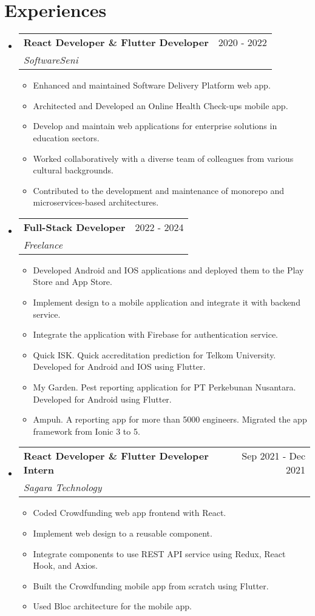 \documentclass[a4paper,11pt]{article}
\makeatletter
\newcommand{\resumeSubheading}[4]{
  \vspace{-2pt}
\item
  \begin{tabular*}{0.97\textwidth}[t]{l@{\extracolsep{\fill}}r}
    \textbf{#1} & #2 \\
    \textit{\small#3} & \textit{\small #4} \\
  \end{tabular*}\vspace{-8pt}
}
\makeatother
\begin{document}
\section{Experiences}
\begin{itemize}[leftmargin=0.15in, label={}]
    \resumeSubheading{React Developer \& Flutter Developer}{2020 - 2022}{SoftwareSeni}{}
    \begin{itemize}
      \item Enhanced and maintained Software Delivery Platform web app.
      \item Architected and Developed an Online Health Check-ups mobile app.
      \item Develop and maintain web applications for enterprise solutions in education sectors.
      \item Worked collaboratively with a diverse team of colleagues from various cultural backgrounds.
      \item Contributed to the development and maintenance of monorepo and microservices-based architectures.
    \end{itemize}\vspace{-4pt}

    \resumeSubheading{Full-Stack Developer}{2022 - 2024}{Freelance}{}
    \begin{itemize}
      \item Developed Android and IOS applications and deployed them to the Play Store and App Store.
      \item Implement design to a mobile application and integrate it with backend service.
      \item Integrate the application with Firebase for authentication service.
      \item Quick ISK. Quick accreditation prediction for Telkom University. Developed for Android and IOS using Flutter.
      \item My Garden. Pest reporting application for PT Perkebunan Nusantara. Developed for Android using Flutter.
      \item Ampuh. A reporting app for more than 5000 engineers. Migrated the app framework from Ionic 3 to 5.
    \end{itemize}\vspace{-4pt}

    \resumeSubheading{React Developer \& Flutter Developer Intern}{Sep 2021 - Dec 2021}{Sagara Technology}{}
    \begin{itemize}
      \item Coded Crowdfunding web app frontend with React.
      \item Implement web design to a reusable component.
      \item Integrate components to use REST API service using Redux, React Hook, and Axios.
      \item Built the Crowdfunding mobile app from scratch using Flutter.
      \item Used Bloc architecture for the mobile app.
    \end{itemize}\vspace{-4pt}

\end{itemize}
\end{document}
